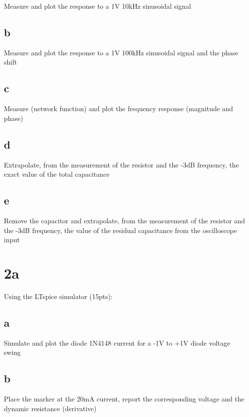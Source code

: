 \documentclass{article}
\begin{document}
	Measure and plot the response to a 1V 10kHz sinusoidal signal
	
	\subsection*{b}
	
	Measure and plot the response to a 1V 100kHz sinusoidal signal and the phase shift
	
	\subsection*{c}
	
	Measure (network function) and plot the frequency response (magnitude and phase)
	
	\subsection*{d}
	
	Extrapolate, from the measurement of the resistor and the -3dB frequency, the exact value of the total capacitance
	
	\subsection*{e}
	
	Remove the capacitor and extrapolate, from the measurement of the resistor and the -3dB
	frequency, the value of the residual capacitance from the oscilloscope input
	
	\section*{2a}
	
	Using the LTspice simulator (15pts):
	
	\subsection*{a}
	
	Simulate and plot the diode 1N4148 current for a -1V to +1V diode voltage swing
	
	\subsection*{b}
	
	Place the marker at the 20mA current, report the corresponding voltage and the dynamic resistance (derivative)
	
\end{document}

